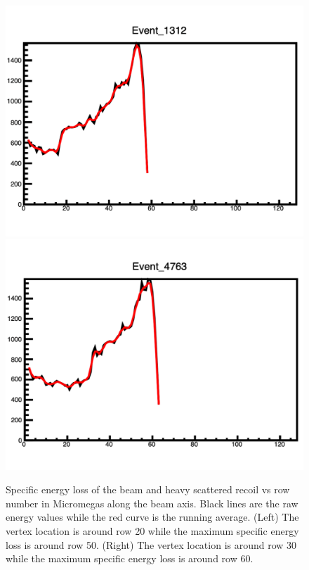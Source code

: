 \documentclass[final,number,sort&compress,5p,times,twocolumn]{elsarticle}
\begin{document}
\begin{figure}[hbt!]
  		\includegraphics[width=\linewidth]{figures/9C_Center_Energy_1}
  		\includegraphics[width=\linewidth]{figures/9C_Center_Energy_2}
	\caption{Specific energy loss of the beam and heavy scattered recoil vs row number in Micromegas along the beam axis. Black lines are the raw energy values while the red curve is the running average. (Left) The vertex location is around row 20 while the maximum specific energy loss is around row 50. (Right) The vertex location is around row 30 while the maximum specific energy loss is around row 60.}
	\label{fig:9C_Center_Energy_Deposition}
\end{figure}
\end{document}
